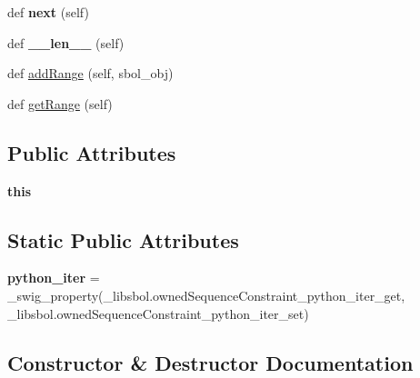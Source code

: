 \begin{DoxyCompactItemize}
\item 
def {\bfseries next} (self)\hypertarget{classsbol_1_1libsbol_1_1owned_sequence_constraint_abd62d8461438354b2a5863873896c890}{}\label{classsbol_1_1libsbol_1_1owned_sequence_constraint_abd62d8461438354b2a5863873896c890}

\item 
def {\bfseries \+\_\+\+\_\+len\+\_\+\+\_\+} (self)\hypertarget{classsbol_1_1libsbol_1_1owned_sequence_constraint_ab95a9acf42cb595990084242dea5c4c2}{}\label{classsbol_1_1libsbol_1_1owned_sequence_constraint_ab95a9acf42cb595990084242dea5c4c2}

\item 
def \hyperlink{classsbol_1_1libsbol_1_1owned_sequence_constraint_a7990b1970ddccf22c40b341010238c4d}{add\+Range} (self, sbol\+\_\+obj)
\item 
def \hyperlink{classsbol_1_1libsbol_1_1owned_sequence_constraint_a665771f78c7eeb342c76eaf4dc7e2050}{get\+Range} (self)
\end{DoxyCompactItemize}
\subsection*{Public Attributes}
\begin{DoxyCompactItemize}
\item 
{\bfseries this}\hypertarget{classsbol_1_1libsbol_1_1owned_sequence_constraint_a3cc70789ae4b0c0bd261061ef94c41a3}{}\label{classsbol_1_1libsbol_1_1owned_sequence_constraint_a3cc70789ae4b0c0bd261061ef94c41a3}

\end{DoxyCompactItemize}
\subsection*{Static Public Attributes}
\begin{DoxyCompactItemize}
\item 
{\bfseries python\+\_\+iter} = \+\_\+swig\+\_\+property(\+\_\+libsbol.\+owned\+Sequence\+Constraint\+\_\+python\+\_\+iter\+\_\+get, \+\_\+libsbol.\+owned\+Sequence\+Constraint\+\_\+python\+\_\+iter\+\_\+set)\hypertarget{classsbol_1_1libsbol_1_1owned_sequence_constraint_ab1b3ee96a2594cfd1f74af6cd5d8e78f}{}\label{classsbol_1_1libsbol_1_1owned_sequence_constraint_ab1b3ee96a2594cfd1f74af6cd5d8e78f}

\end{DoxyCompactItemize}


\subsection{Constructor \& Destructor Documentation}
